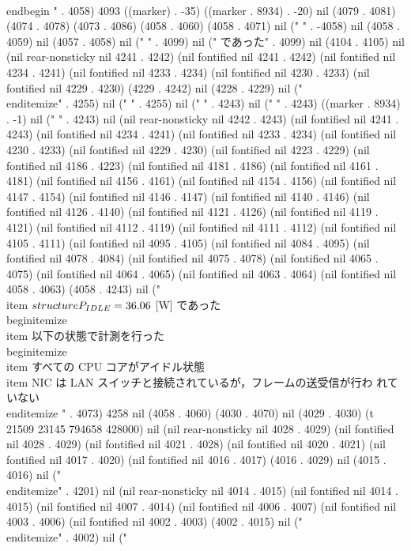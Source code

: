   \\end{begin}
" . 4058) 4093 ((marker) . -35) ((marker . 8934) . -20) nil (4079 . 4081) (4074 . 4078) (4073 . 4086) (4058 . 4060) (4058 . 4071) nil (" " . -4058) nil (4058 . 4059) nil (4057 . 4058) nil ("
" . 4099) nil (" であった" . 4099) nil (4104 . 4105) nil (nil rear-nonsticky nil 4241 . 4242) (nil fontified nil 4241 . 4242) (nil fontified nil 4234 . 4241) (nil fontified nil 4233 . 4234) (nil fontified nil 4230 . 4233) (nil fontified nil 4229 . 4230) (4229 . 4242) nil (4228 . 4229) nil ("\\end{itemize}" . 4255) nil ("
" . 4255) nil ("
" . 4243) nil (" " . 4243) ((marker . 8934) . -1) nil (" " . 4243) nil (nil rear-nonsticky nil 4242 . 4243) (nil fontified nil 4241 . 4243) (nil fontified nil 4234 . 4241) (nil fontified nil 4233 . 4234) (nil fontified nil 4230 . 4233) (nil fontified nil 4229 . 4230) (nil fontified nil 4223 . 4229) (nil fontified nil 4186 . 4223) (nil fontified nil 4181 . 4186) (nil fontified nil 4161 . 4181) (nil fontified nil 4156 . 4161) (nil fontified nil 4154 . 4156) (nil fontified nil 4147 . 4154) (nil fontified nil 4146 . 4147) (nil fontified nil 4140 . 4146) (nil fontified nil 4126 . 4140) (nil fontified nil 4121 . 4126) (nil fontified nil 4119 . 4121) (nil fontified nil 4112 . 4119) (nil fontified nil 4111 . 4112) (nil fontified nil 4105 . 4111) (nil fontified nil 4095 . 4105) (nil fontified nil 4084 . 4095) (nil fontified nil 4078 . 4084) (nil fontified nil 4075 . 4078) (nil fontified nil 4065 . 4075) (nil fontified nil 4064 . 4065) (nil fontified nil 4063 . 4064) (nil fontified nil 4058 . 4063) (4058 . 4243) nil ("\\item $\\structure{P_{IDLE}} =  36.06$ [W] であった
\\begin{itemize}
\\item 以下の状態で計測を行った
\\begin{itemize}
\\item すべての CPU コアがアイドル状態
\\item NIC は LAN スイッチと接続されているが，フレームの送受信が行わ
れていない
\\end{itemize}
" . 4073) 4258 nil (4058 . 4060) (4030 . 4070) nil (4029 . 4030) (t 21509 23145 794658 428000) nil (nil rear-nonsticky nil 4028 . 4029) (nil fontified nil 4028 . 4029) (nil fontified nil 4021 . 4028) (nil fontified nil 4020 . 4021) (nil fontified nil 4017 . 4020) (nil fontified nil 4016 . 4017) (4016 . 4029) nil (4015 . 4016) nil ("\\end{itemize}" . 4201) nil (nil rear-nonsticky nil 4014 . 4015) (nil fontified nil 4014 . 4015) (nil fontified nil 4007 . 4014) (nil fontified nil 4006 . 4007) (nil fontified nil 4003 . 4006) (nil fontified nil 4002 . 4003) (4002 . 4015) nil ("\\end{itemize}" . 4002) nil ("
